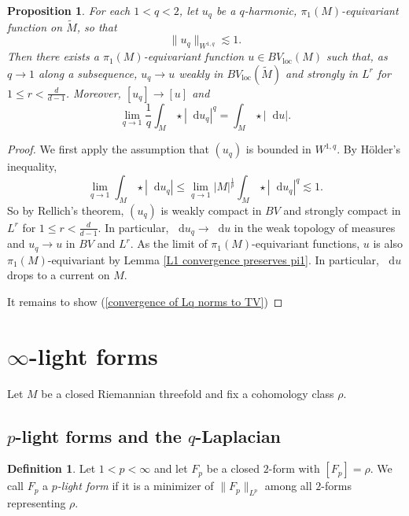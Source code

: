 \documentclass[reqno,11pt]{amsart}
\newcommand*\dif{\mathop{}\!\mathrm{d}}
\newcommand{\dfn}[1]{\emph{#1}\index{#1}}
\newcommand{\loc}{\mathrm{loc}}
\newtheorem{proposition}[theorem]{Proposition}
\theoremstyle{definition}
\newtheorem{definition}[theorem]{Definition}
\numberwithin{equation}{section}
\begin{document}
\begin{proposition}\label{qharmonics converge}
For each $1 < q < 2$, let $u_q$ be a $q$-harmonic, $\pi_1(M)$-equivariant function on $\tilde M$, so that
$$\|u_q\|_{W^{1, q}} \lesssim 1.$$
Then there exists a $\pi_1(M)$-equivariant function $u \in BV_\loc(M)$ such that, as $q \to 1$ along a subsequence, $u_q \to u$ weakly in $BV_\loc(\tilde M)$ and strongly in $L^r$ for $1 \leq r < \frac{d}{d - 1}$.
Moreover, $[u_q] \to [u]$ and
\begin{equation}\label{convergence of Lq norms to TV}
\lim_{q \to 1} \frac{1}{q} \int_M \star |\dif u_q|^q = \int_M \star |\dif u|.
\end{equation}
\end{proposition}
\begin{proof}
We first apply the assumption that $(u_q)$ is bounded in $W^{1, q}$.
By H\"older's inequality,
$$\lim_{q \to 1} \int_M \star |\dif u_q| \leq \lim_{q \to 1} |M|^{\frac{1}{p}} \int_M \star |\dif u_q|^q \lesssim 1.$$
So by Rellich's theorem, $(u_q)$ is weakly compact in $BV$ and strongly compact in $L^r$ for $1 \leq r < \frac{d}{d - 1}$.
In particular, $\dif u_q \to \dif u$ in the weak topology of measures and $u_q \to u$ in $BV$ and $L^r$.
As the limit of $\pi_1(M)$-equivariant functions, $u$ is also $\pi_1(M)$-equivariant by Lemma \ref{L1 convergence preserves pi1}.
In particular, $\dif u$ drops to a current on $M$.

It remains to show (\ref{convergence of Lq norms to TV})
\end{proof}

\section{\texorpdfstring{$\infty$-light forms}{Infinity-light forms}}
Let $M$ be a closed Riemannian threefold and fix a cohomology class $\rho$.

\subsection{\texorpdfstring{$p$-light forms and the $q$-Laplacian}{p-light forms and the q-Laplacian}}
\begin{definition}
Let $1 < p < \infty$ and let $F_p$ be a closed $2$-form with $[F_p] = \rho$.
We call $F_p$ a \dfn{$p$-light form} if it is a minimizer of $\|F_p\|_{L^p}$ among all $2$-forms representing $\rho$.
\end{definition}
\end{document}
